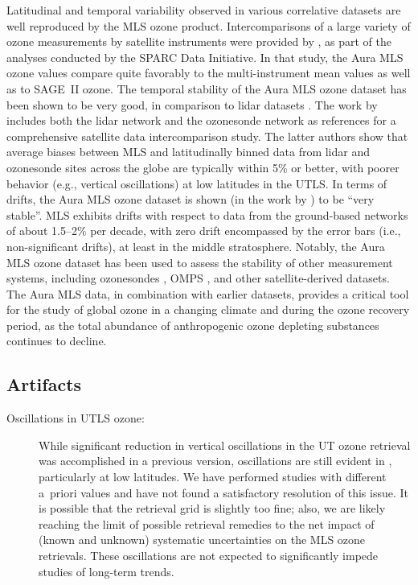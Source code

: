 Latitudinal and temporal variability observed in various correlative datasets are well reproduced by the MLS ozone product. Intercomparisons of a large variety of ozone measurements by satellite instruments were provided by \citet{TegtmeierEtal:2013}, as part of the analyses conducted by the SPARC Data Initiative. In that study, the Aura MLS ozone values compare quite favorably to the multi-instrument mean values as well as to SAGE~II ozone. The temporal stability of the Aura MLS ozone dataset has been shown to be very good, in comparison to lidar datasets \citep{NairEtal:2012}. The work by \citet{HubertEtal:2016} includes both the lidar network and the ozonesonde network as references for a comprehensive satellite data intercomparison study. The latter authors show that average biases between MLS and latitudinally binned data from lidar and ozonesonde sites across the globe are typically within 5\% or better, with poorer behavior (e.g., vertical oscillations) at low latitudes in the UTLS\@. In terms of drifts, the Aura MLS ozone dataset is shown (in the work by \citet{HubertEtal:2016}) to be ``very stable''. MLS exhibits drifts with respect to data from the ground-based networks of about 1.5--2\% per decade, with zero drift encompassed by the error bars (i.e., non-significant drifts), at least in the middle stratosphere. Notably, the Aura MLS ozone dataset has been used to assess the stability of other measurement systems, including ozonesondes \citep{StaufferEtal:2022}, OMPS \citep{KramarovaEtal:2018}, and other satellite-derived datasets.  The Aura MLS data, in combination with earlier datasets, provides a critical tool for the study of global ozone in a changing climate and during the ozone recovery period, as the total abundance of anthropogenic ozone depleting substances continues to decline.

\subsection{Artifacts}

\begin{description}
  \item[Oscillations in UTLS ozone:] While significant reduction in vertical oscillations in the UT ozone retrieval was accomplished in a previous version, oscillations are still evident in \thisv, particularly at low latitudes. We have performed studies with different a~priori values and have not found a satisfactory resolution of this issue. It is possible that the retrieval grid is slightly too fine; also, we are likely reaching the limit of possible retrieval remedies to the net impact of (known and unknown) systematic uncertainties on the MLS ozone retrievals. These oscillations are not expected to significantly impede studies of long-term trends.
\end{description}

